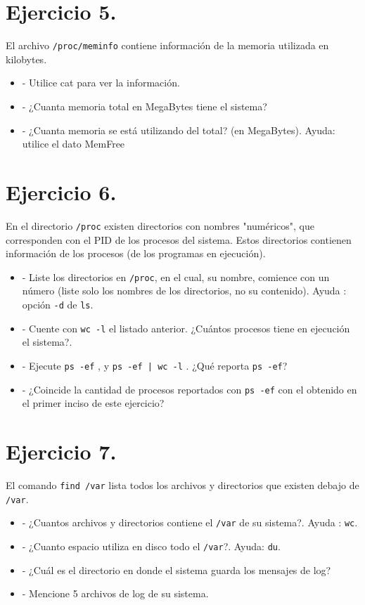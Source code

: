 \documentclass[12pt]{article}
\begin{document}
\section{Ejercicio 5.}
El archivo \texttt{/proc/meminfo} contiene información de la memoria utilizada en kilobytes.

\begin{itemize}
\item - Utilice cat para ver la información.
\item - ¿Cuanta memoria total en MegaBytes tiene el sistema?
\item - ¿Cuanta memoria se está utilizando del total? (en MegaBytes). Ayuda: utilice el dato MemFree
\end{itemize}


\section{Ejercicio 6.}
En el directorio \texttt{/proc} existen directorios con nombres "numéricos", que corresponden con el PID de los procesos del sistema.
Estos directorios contienen información de los procesos (de los programas en ejecución).
\begin{itemize}
\item - Liste los directorios en \texttt{/proc}, en el cual, su nombre, comience con un número (liste solo los nombres de los directorios, no su contenido). Ayuda : opción \texttt{-d} de \texttt{ls}.
\item - Cuente con \texttt{wc -l} el listado anterior. ¿Cuántos procesos tiene en ejecución el sistema?.
\item - Ejecute \texttt{ps -ef} , y \texttt{ps -ef | wc -l} . ¿Qué reporta \texttt{ps -ef}?
\item - ¿Coincide la cantidad de procesos reportados con \texttt{ps -ef} con el obtenido en el primer inciso de este ejercicio?
\end{itemize}


\section{Ejercicio 7.}
El comando \texttt{find /var} lista todos los archivos y directorios que existen debajo de \texttt{/var}.
\begin{itemize}
\item - ¿Cuantos archivos y directorios contiene el \texttt{/var} de su sistema?. Ayuda : \texttt{wc}.
\item - ¿Cuanto espacio utiliza en disco todo el \texttt{/var}?. Ayuda: \texttt{du}.
\item - ¿Cuál es el directorio en donde el sistema guarda los mensajes de log?
\item - Mencione 5 archivos de log de su sistema.
\end{itemize}
\end{document}
